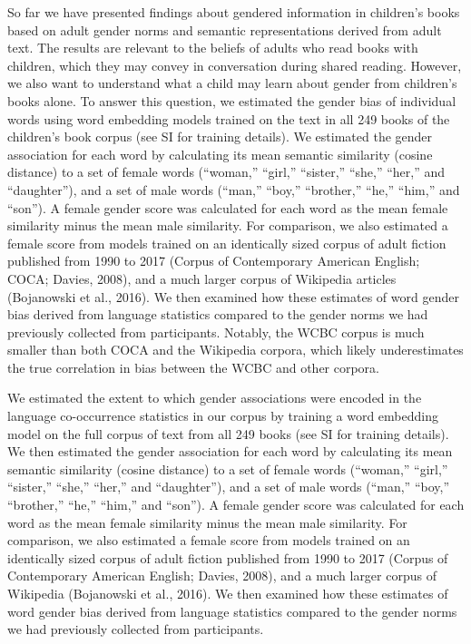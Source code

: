 \documentclass[english,,man,floatsintext]{apa6}
\begin{document}
So far we have presented findings about gendered information in children's books based on adult gender norms and semantic representations derived from adult text. The results are relevant to the beliefs of adults who read books with children, which they may convey in conversation during shared reading. However, we also want to understand what a child may learn about gender from children's books alone. To answer this question, we estimated the gender bias of individual words using word embedding models trained on the text in all 249 books of the children's book corpus (see SI for training details). We estimated the gender association for each word by calculating its mean semantic similarity (cosine distance) to a set of female words (\enquote{woman,} \enquote{girl,} \enquote{sister,} \enquote{she,} \enquote{her,} and \enquote{daughter}), and a set of male words (\enquote{man,} \enquote{boy,} \enquote{brother,} \enquote{he,} \enquote{him,} and \enquote{son}). A female gender score was calculated for each word as the mean female similarity minus the mean male similarity. For comparison, we also estimated a female score from models trained on an identically sized corpus of adult fiction published from 1990 to 2017 (Corpus of Contemporary American English; COCA; Davies, 2008), and a much larger corpus of Wikipedia articles (Bojanowski et al., 2016). We then examined how these estimates of word gender bias derived from language statistics compared to the gender norms we had previously collected from participants. Notably, the WCBC corpus is much smaller than both COCA and the Wikipedia corpora, which likely underestimates the true correlation in bias between the WCBC and other corpora.

We estimated the extent to which gender associations were encoded in the language co-occurrence statistics in our corpus by training a word embedding model on the full corpus of text from all 249 books (see SI for training details). We then estimated the gender association for each word by calculating its mean semantic similarity (cosine distance) to a set of female words (\enquote{woman,} \enquote{girl,} \enquote{sister,} \enquote{she,} \enquote{her,} and \enquote{daughter}), and a set of male words (\enquote{man,} \enquote{boy,} \enquote{brother,} \enquote{he,} \enquote{him,} and \enquote{son}). A female gender score was calculated for each word as the mean female similarity minus the mean male similarity. For comparison, we also estimated a female score from models trained on an identically sized corpus of adult fiction published from 1990 to 2017 (Corpus of Contemporary American English; Davies, 2008), and a much larger corpus of Wikipedia (Bojanowski et al., 2016). We then examined how these estimates of word gender bias derived from language statistics compared to the gender norms we had previously collected from participants.
\end{document}
